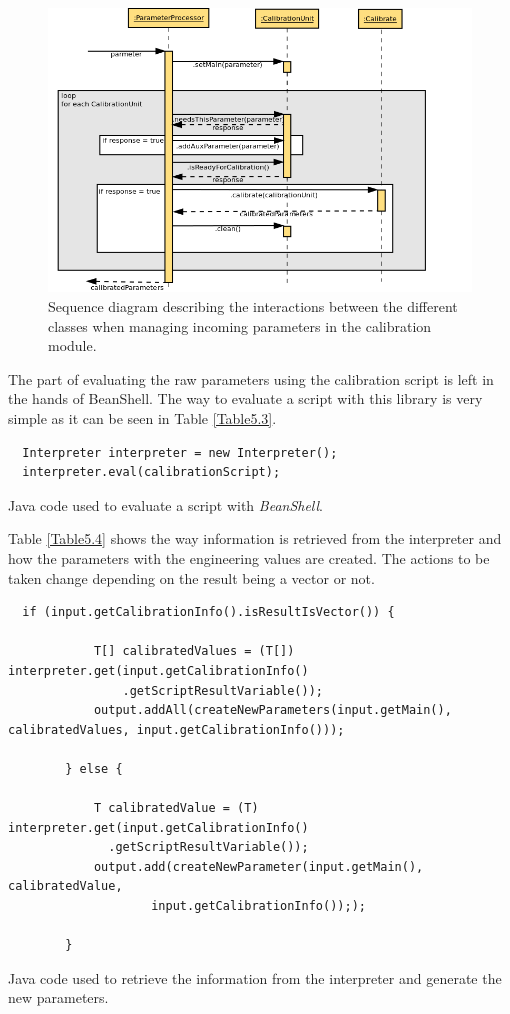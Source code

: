 \begin{figure}[H]
\centerline{\includegraphics[width=1\textwidth]{images/ReceiveParameterAndCalibrateSequence.png}}
\caption{Sequence diagram describing the interactions between the different classes when managing incoming parameters in the calibration module.}
\label{f5.6}
\end{figure}


The part of evaluating the raw parameters using the calibration script is left in the hands of BeanShell. The way to evaluate a script with this library is very simple as it can be seen in Table \ref{Table5.3}. 


\begin{table}[h]
\lstset{language=Java}
\begin{lstlisting}
  Interpreter interpreter = new Interpreter();
  interpreter.eval(calibrationScript);
\end{lstlisting}
\caption{Java code used to evaluate a script with \emph{BeanShell}.}
\label{Table5.3}
\end{table}


Table \ref{Table5.4} shows the way information is retrieved from the interpreter and how the parameters with the engineering values are created. The actions to be taken change depending on the result being a vector or not.

\begin{table}[H]
\lstset{language=Java}
\begin{lstlisting}
  if (input.getCalibrationInfo().isResultIsVector()) {

            T[] calibratedValues = (T[]) interpreter.get(input.getCalibrationInfo()
                .getScriptResultVariable());
            output.addAll(createNewParameters(input.getMain(), calibratedValues, input.getCalibrationInfo()));

        } else {

            T calibratedValue = (T) interpreter.get(input.getCalibrationInfo()
              .getScriptResultVariable());
            output.add(createNewParameter(input.getMain(), calibratedValue,
                    input.getCalibrationInfo()););

        }
\end{lstlisting}
\caption{Java code used to retrieve the information from the interpreter and generate the new parameters.}
\label{Table5.4}
\end{table}


